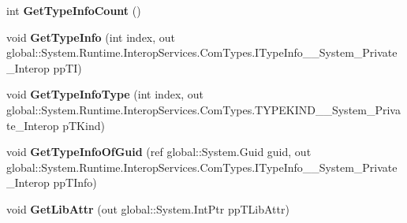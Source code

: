 \begin{DoxyCompactItemize}
\mbox{\label{interface_system_1_1_runtime_1_1_interop_services_1_1_com_types_1_1_i_type_lib_____system___private___interop_a2698e0279128bfafc4c5f48be7a1e066}} 
int {\bfseries Get\+Type\+Info\+Count} ()
\item 
\mbox{\label{interface_system_1_1_runtime_1_1_interop_services_1_1_com_types_1_1_i_type_lib_____system___private___interop_a294102830607259f08459d9bd9c31d4e}} 
void {\bfseries Get\+Type\+Info} (int index, out global\+::\+System.\+Runtime.\+Interop\+Services.\+Com\+Types.\+I\+Type\+Info\+\_\+\+\_\+\+System\+\_\+\+Private\+\_\+\+Interop pp\+TI)
\item 
\mbox{\label{interface_system_1_1_runtime_1_1_interop_services_1_1_com_types_1_1_i_type_lib_____system___private___interop_a986454fa9fc37dfd64ab594c0fc42232}} 
void {\bfseries Get\+Type\+Info\+Type} (int index, out global\+::\+System.\+Runtime.\+Interop\+Services.\+Com\+Types.\+T\+Y\+P\+E\+K\+I\+N\+D\+\_\+\+\_\+\+System\+\_\+\+Private\+\_\+\+Interop p\+T\+Kind)
\item 
\mbox{\label{interface_system_1_1_runtime_1_1_interop_services_1_1_com_types_1_1_i_type_lib_____system___private___interop_a29c3f76d3f2e6750db6203a42ad93a69}} 
void {\bfseries Get\+Type\+Info\+Of\+Guid} (ref global\+::\+System.\+Guid guid, out global\+::\+System.\+Runtime.\+Interop\+Services.\+Com\+Types.\+I\+Type\+Info\+\_\+\+\_\+\+System\+\_\+\+Private\+\_\+\+Interop pp\+T\+Info)
\item 
\mbox{\label{interface_system_1_1_runtime_1_1_interop_services_1_1_com_types_1_1_i_type_lib_____system___private___interop_ac1b35c8576242797a74466d7999c3d30}} 
void {\bfseries Get\+Lib\+Attr} (out global\+::\+System.\+Int\+Ptr pp\+T\+Lib\+Attr)
\item 
\mbox{\label{interface_system_1_1_runtime_1_1_interop_services_1_1_com_types_1_1_i_type_lib_____system___private___interop_a1ec943ec9b2d14dd70c3367706164a45}} 

\end{DoxyCompactItemize}
